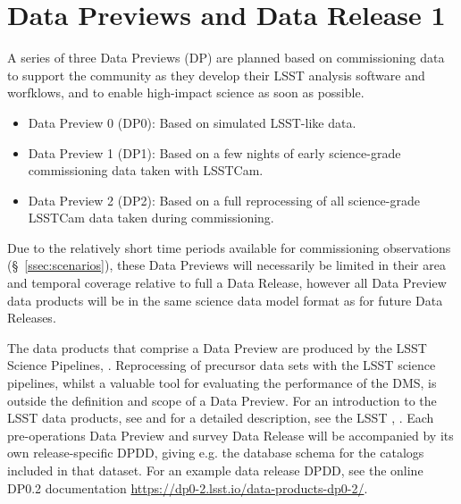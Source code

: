 \section{Data Previews and Data Release 1} 
\label{sec:datapreview}

A series of three Data Previews (DP) are planned  based on commissioning data to support the community as they develop their LSST analysis software and worfklows, and to enable high-impact science as soon as possible.
\begin{itemize}
\item Data Preview 0 (DP0): Based on simulated LSST-like data.
\item Data Preview 1 (DP1): Based on a few nights of early science-grade commissioning data taken with LSSTCam.
\item Data Preview 2 (DP2): Based on a full reprocessing of all science-grade LSSTCam data taken during commissioning.
\end{itemize}

Due to the relatively short time periods available for commissioning observations (\S~\ref{ssec:scenarios}), these Data Previews will necessarily be limited in their area and temporal coverage relative to full a Data Release, however all Data Preview data products will be in the same science data model format as for future Data Releases.

The data products that comprise a Data Preview are produced by the LSST Science Pipelines, \cite{2019ASPC..523..521B,2018PASJ...70S...5B}.
Reprocessing of precursor data sets with the LSST science pipelines, whilst a valuable tool for evaluating the performance of the DMS, is outside the definition and scope of a Data Preview.
For an introduction to the LSST data products, see \citet{RubinDataProductsAbridged} and for a detailed description, see the LSST \dpdd{},  .
Each pre-operations Data Preview and survey Data Release will be accompanied by its own release-specific DPDD, giving e.g. the  database schema for the catalogs included in that dataset.
For an example data release DPDD, see the online DP0.2 documentation {\url{https://dp0-2.lsst.io/data-products-dp0-2/}}.

